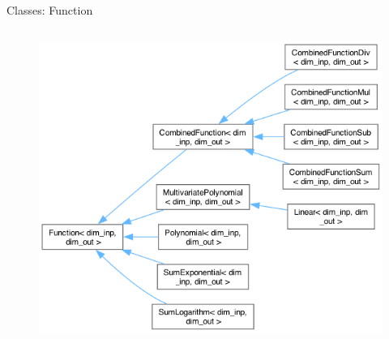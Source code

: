 \documentclass[8pt]{beamer}
\begin{document}
\begin{frame}{Classes: Function}
\begin{columns}
         {\centering \begin{figure} \centering \includegraphics[width=\textwidth]{img/inherit_Function.png} \end{figure}}

\end{columns}
\end{frame}
\end{document}
